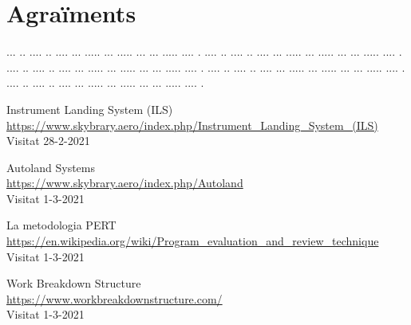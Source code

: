 \documentclass[10pt,a4paper,twocolumn,twoside]{article}
\begin{document}
\section*{Agraïments}

... ..  .... .. .... ... ..... ... ..... ... ... ..... .... .
.... ..  .... .. .... ... ..... ... ..... ... ... ..... .... .
.... ..  .... .. .... ... ..... ... ..... ... ... ..... .... .
.... ..  .... .. .... ... ..... ... ..... ... ... ..... .... .
.... ..  .... .. .... ... ..... ... ..... ... ... ..... .... .

\begin{thebibliography}{9}
Instrument Landing System (ILS)
\\\url{https://www.skybrary.aero/index.php/Instrument_Landing_System_(ILS)}
\\Visitat 28-2-2021

Autoland Systems
\\\url{https://www.skybrary.aero/index.php/Autoland}
\\Visitat 1-3-2021

La metodologia PERT
\\\url{https://en.wikipedia.org/wiki/Program_evaluation_and_review_technique}
\\Visitat 1-3-2021

Work Breakdown Structure
\\\url{https://www.workbreakdownstructure.com/}
\\Visitat 1-3-2021

\end{thebibliography}
\end{document}
